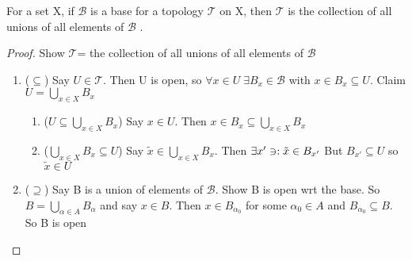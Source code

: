 \documentclass[11pt]{amsart}
\begin{document}
\begin{lemma}
For a set X, if $\mathcal{B}$ is a base for a topology $\mathcal{T}$ on X, then  $\mathcal{T}$ is the collection of all unions of all elements of $\mathcal{B}$ .
\begin{proof} Show $\mathcal{T}$= the collection of all unions of all elements of $\mathcal{B}$
\begin{enumerate}
\item ($\subseteq$) Say $U \in \mathcal{T}$. Then U is open, so $\forall x \in U \; \exists B_x \in \mathcal{B}$ with $x \in B_x \subseteq U$. 
Claim $U = \bigcup\limits_{x \in X} B_x$
\begin{enumerate}
\item ($U \subseteq  \bigcup\limits_{x \in X} B_x$) Say $x \in U$. Then $x \in B_x \subseteq \bigcup\limits_{x \in X} B_x$
\item ($ \bigcup\limits_{x \in X} B_x \subseteq U$) Say $\tilde{x} \in \bigcup\limits_{x \in X} B_x$. Then $\exists x' \ni : \tilde{x} \in B_{x'}$ But $B_{x'} \subseteq U$ so $\tilde{x} \in U$
\end{enumerate}
\item  ($\supseteq$) Say B is a union of elements of  $\mathcal{B}$. Show B is open wrt the base. So $B = \bigcup\limits_{\alpha \in A} B_{\alpha}$ and say $x \in B$. Then $x \in B_{\alpha_0}$ for some $\alpha_0 \in A$ and $B_{\alpha_0} \subseteq B$. So B is open
\end{enumerate}
\end{proof}
\end{lemma}
\end{document}
